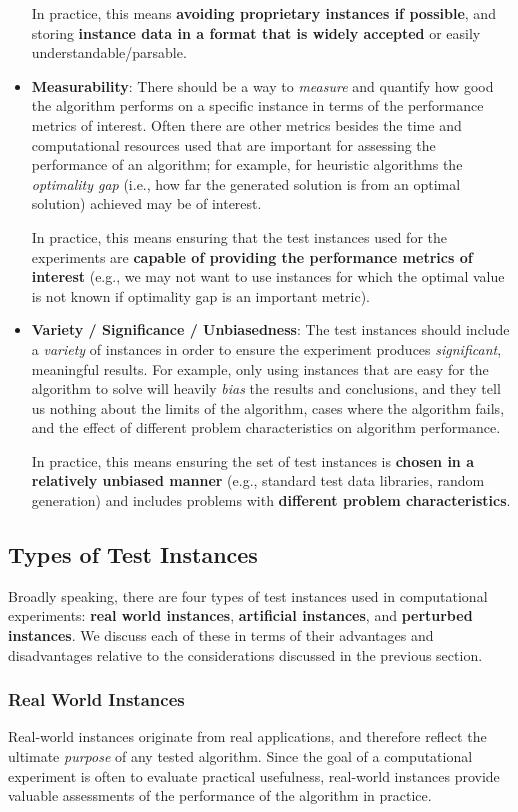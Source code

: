 \documentclass[12pt]{article}
\begin{document}
\begin{itemize}
        In practice, this means \textbf{avoiding proprietary instances if possible}, and storing \textbf{instance data in a format that is widely accepted} or easily understandable/parsable.
    \item \textbf{Measurability}: There should be a way to \emph{measure} and quantify how good the algorithm performs on a specific instance in terms of the performance metrics of interest. Often there are other metrics besides the time and computational resources used that are important for assessing the performance of an algorithm; for example, for heuristic algorithms the \emph{optimality gap} (i.e., how far the generated solution is from an optimal solution) achieved may be of interest.

        In practice, this means ensuring that the test instances used for the experiments are \textbf{capable of providing the performance metrics of interest} (e.g., we may not want to use instances for which the optimal value is not known if optimality gap is an important metric).
    \item \textbf{Variety / Significance / Unbiasedness}: The test instances should include a \emph{variety} of instances in order to ensure the experiment produces \emph{significant}, meaningful results. For example, only using instances that are easy for the algorithm to solve will heavily \emph{bias} the results and conclusions, and they tell us nothing about the limits of the algorithm, cases where the algorithm fails, and the effect of different problem characteristics on algorithm performance.

        In practice, this means ensuring the set of test instances is \textbf{chosen in a relatively unbiased manner} (e.g., standard test data libraries, random generation) and includes problems with \textbf{different problem characteristics}.
\end{itemize}

\subsection{Types of Test Instances}
Broadly speaking, there are four types of test instances used in computational experiments: \textbf{real world instances}, \textbf{artificial instances}, and \textbf{perturbed instances}. We discuss each of these in terms of their advantages and disadvantages relative to the considerations discussed in the previous section.

\subsubsection{Real World Instances}
Real-world instances originate from real applications, and therefore reflect the ultimate \emph{purpose} of any tested algorithm. Since the goal of a computational experiment is often to evaluate practical usefulness, real-world instances provide valuable assessments of the performance of the algorithm in practice.
\end{document}
